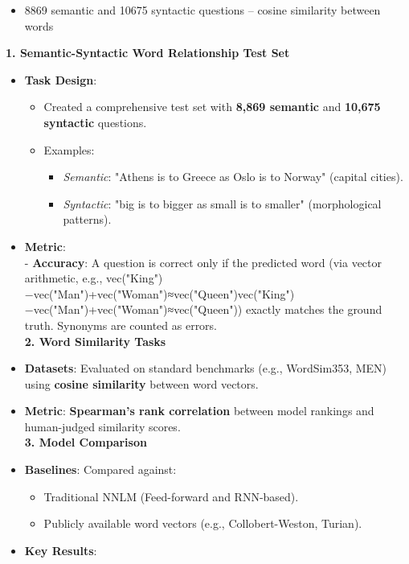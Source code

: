 \documentclass[
]{article}
\providecommand{\tightlist}{%
  \setlength{\itemsep}{0pt}\setlength{\parskip}{0pt}}
\begin{document}
\begin{itemize}
\tightlist
\item
  8869 semantic and 10675 syntactic questions -- cosine similarity
  between words
\end{itemize}

\textbf{1. Semantic-Syntactic Word Relationship Test Set}

\begin{itemize}
\tightlist
\item
  \textbf{Task Design}:

  \begin{itemize}
  \tightlist
  \item
    Created a comprehensive test set with \textbf{8,869 semantic} and
    \textbf{10,675 syntactic} questions.
  \item
    Examples:

    \begin{itemize}
    \tightlist
    \item
      \emph{Semantic}: "Athens is to Greece as Oslo is to Norway"
      (capital cities).
    \item
      \emph{Syntactic}: "big is to bigger as small is to smaller"
      (morphological patterns).
    \end{itemize}
  \end{itemize}
\item
  \textbf{Metric}:\\
  - \textbf{Accuracy}: A question is correct only if the predicted word
  (via vector arithmetic, e.g.,
  vec("King")−vec("Man")+vec("Woman")≈vec("Queen")vec("King")−vec("Man")+vec("Woman")≈vec("Queen"))
  exactly matches the ground truth. Synonyms are counted as errors.\\
  \textbf{2. Word Similarity Tasks}
\item
  \textbf{Datasets}: Evaluated on standard benchmarks (e.g., WordSim353,
  MEN) using \textbf{cosine similarity} between word vectors.
\item
  \textbf{Metric}: \textbf{Spearman's rank correlation} between model
  rankings and human-judged similarity scores.\\
  \textbf{3. Model Comparison}
\item
  \textbf{Baselines}: Compared against:

  \begin{itemize}
  \tightlist
  \item
    Traditional NNLM (Feed-forward and RNN-based).
  \item
    Publicly available word vectors (e.g., Collobert-Weston, Turian).
  \end{itemize}
\item
  \textbf{Key Results}:


\end{itemize}
\end{document}
